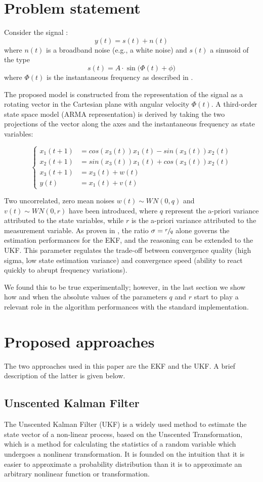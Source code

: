 \documentclass{article}
\begin{document}
\section{Problem statement}
Consider the signal : 
$$y(t) = s(t) + n(t)$$
where $n(t)$ is a broadband noise (e.g., a white noise) and $s(t)$ a sinusoid of the type $$s(t) = A\cdot\sin\big(\Phi(t) + \phi\big)$$ where $\Phi(t)$ is the instantaneous frequency as described in \cite{IF}.

The proposed model is constructed from the representation of the signal as a rotating vector in the Cartesian plane with angular velocity $\Phi(t)$. A third-order state space model (ARMA representation) is derived by taking the two projections of the vector along the axes and the instantaneous frequency as state variables: 

\[
\left\{
\begin{aligned}
x_1(t+1) &= cos(x_3(t))x_1(t)-sin(x_3(t))x_2(t) \\
x_2(t+1) &= sin(x_3(t))x_1(t)+cos(x_3(t))x_2(t) \\
x_3(t+1) &= x_3(t)+w(t) \\
y(t)  &= x_1(t)+v(t)
\end{aligned} \right.
\]

Two uncorrelated, zero mean noises $w(t)\sim WN(0,q)$ and $v(t)\sim WN(0,r)$ have been introduced, where $q$ represent the a-priori variance attributed to the state variables, while $r$ is the a-priori variance attributed to the measurement variable. As proven in \cite{EKF}, the ratio $\sigma = \sfrac{r}{q}$ alone governs the estimation performances for the EKF, and the reasoning can be extended to the UKF. This parameter regulates the trade-off between convergence quality (high sigma, low state estimation variance)  and convergence speed (ability to react quickly to abrupt frequency variations). 

We found this to be true experimentally; however, in the last section we show how and when the absolute values of the parameters $q$ and $r$ start to play a relevant role in the algorithm performances with the standard implementation.

\section{Proposed approaches}
The two approaches used in this paper are the EKF and the UKF. A brief description of the latter is given below.

\subsection{Unscented Kalman Filter}

The Unscented Kalman Filter (UKF) is a widely used method to estimate the state vector of a non-linear process, based on the Unscented Transformation, which is a method for calculating the statistics of a random variable which undergoes a nonlinear transformation. It is founded on the intuition that it is easier to approximate a probability distribution than it is to approximate an arbitrary nonlinear function or transformation. 
\end{document}
